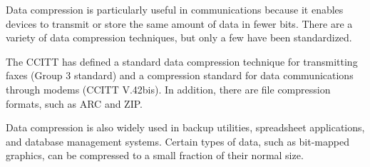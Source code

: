 Data compression is particularly useful in communications because it enables devices to transmit or store the same amount of data in fewer bits. There are a variety of data compression techniques, but only a few have been standardized.

The CCITT has defined a standard data compression technique for transmitting faxes (Group 3 standard) and a compression standard for data communications through modems (CCITT V.42bis). In addition, there are file compression formats, such as ARC and ZIP.

Data compression is also widely used in backup utilities, spreadsheet applications, and database management systems. Certain types of data, such as bit-mapped graphics, can be compressed to a small fraction of their normal size.
